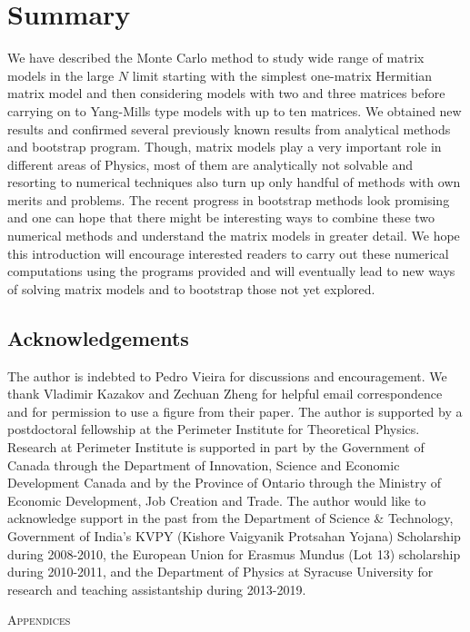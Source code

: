 \documentclass[letter,11pt]{article}
\begin{document}
\section{Summary}

We have described the Monte Carlo method to study wide range of matrix models in the large $N$ limit starting with the simplest one-matrix Hermitian matrix model and then considering models with two and three matrices before carrying on to Yang-Mills type models with up to ten matrices. We obtained new results and confirmed several previously known results from analytical methods and bootstrap program. Though, matrix models play a very important role in different areas of Physics, most of them are analytically not solvable and resorting to numerical techniques also turn up only handful of methods with own merits and problems. The recent progress in bootstrap methods look promising and one can hope that there might be interesting ways to combine these two numerical methods and understand the  matrix models in greater detail. We hope this introduction will encourage interested readers to carry out these numerical computations using the programs provided and will eventually lead to new ways of solving matrix models and to bootstrap those not yet explored.
\vspace{8mm}
\subsection*{Acknowledgements}
The author is indebted to Pedro Vieira
for discussions and encouragement. We thank Vladimir Kazakov 
and Zechuan Zheng for helpful email correspondence and for 
permission to use a figure from their paper. The author is supported by a 
postdoctoral fellowship at the Perimeter Institute for Theoretical Physics. 
Research at Perimeter Institute is supported in part by the Government of Canada through the Department of Innovation, 
Science and Economic Development Canada and by the Province of Ontario through 
the Ministry of Economic Development, Job Creation and Trade.
The author would like to acknowledge support in the past from 
the Department of Science \& Technology, Government of India's KVPY
(Kishore Vaigyanik Protsahan Yojana) Scholarship during 2008-2010, 
the European Union for Erasmus Mundus (Lot 13) scholarship during 2010-2011, 
and the Department of Physics at Syracuse University for research and teaching
assistantship during 2013-2019. 
\vspace{6mm}
\appendix
\begin{center} \large{\textsc{Appendices}}\end{center}
\end{document}
